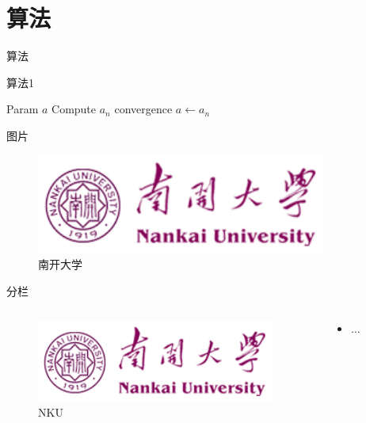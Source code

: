 \documentclass[hyperref,UTF8,11pt]{beamer}
\begin{document}

\section{算法}

\begin{frame}{算法}
    \begin{algorithm}[H]
        \caption{算法1}\label{alg:em}
        \begin{algorithmic}[1]
            \REQUIRE Param
            \ENSURE $a$
            \REPEAT
            \STATE Compute $a_n$
            \UNTIL convergence
            \RETURN $a\leftarrow a_n$
        \end{algorithmic}
    \end{algorithm}    
\end{frame}

\begin{frame}{图片}
    \begin{figure}
        \centering
        \includegraphics[width=0.85\textwidth]{nk_logo.png}
        \caption{南开大学}\label{fig:nk}
    \end{figure}
\end{frame}

\begin{frame}{分栏}
    \begin{columns}
        \begin{column}{0.3\textwidth}
            \begin{figure}
                \centering
                \includegraphics[width=0.95\textwidth]{nk_logo.png}
                \caption{NKU}\label{fig:nku}
            \end{figure}
        \end{column}
        \begin{column}{0.7\textwidth}
            \begin{itemize}
                \item ...
            \end{itemize}
        \end{column}
    \end{columns}
\end{frame}
\end{document}
